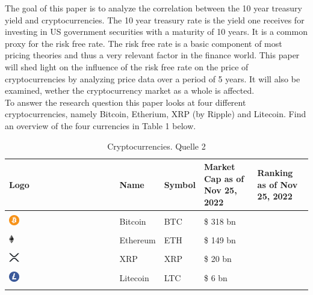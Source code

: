
The goal of this paper is to analyze the correlation between the 10 year treasury yield and cryptocurrencies. The 10 year treasury rate is the yield one receives for investing in US government securities with a maturity of 10 years. It is a common proxy for the risk free rate. The risk free rate is a basic component of most pricing theories and thus a very relevant factor in the finance world. This paper will shed light on the influence of the risk free rate on the price of cryptocurrencies by analyzing price data over a period of 5 years. It will also be examined, wether the cryptocurrency market as a whole is affected.
\\

To answer the research question this paper looks at four different cryptocurrencies, namely Bitcoin, Etherium,  XRP (by Ripple) and Litecoin. Find an overview of the four currencies in Table 1 below.


\begin{table}[H]
\centering %
\begin{tabular}{>{\centering\arraybackslash}m{} >{\centering\arraybackslash}m{} >{\centering\arraybackslash}m{} >{\centering\arraybackslash}m{} >{\centering\arraybackslash}m{}}
\hline
Logo & Name & Symbol & Market Cap as of Nov 25, 2022 & Ranking as of Nov 25, 2022\\
\hline
\\
\includegraphics[width=0.1\textwidth]{images/Bitcoin.png} &  Bitcoin & BTC & \$ 318 bn & 1\\
\\
\includegraphics[width=0.05\textwidth]{images/ETH.png} & Ethereum & ETH & \$ 149 bn & 2\\
\\
\includegraphics[width=0.1\textwidth]{images/XRP.png} & XRP & XRP & \$ 20 bn & 7\\
\\
\includegraphics[width=0.1\textwidth]{images/LTC.png} & Litecoin & LTC & \$ 6 bn & 13\\
\\
\hline
\end{tabular}
\caption{\label{tab1} Cryptocurrencies. Quelle 2}
\end{table}


